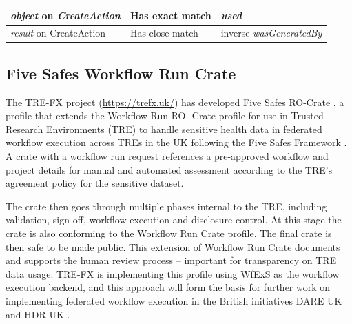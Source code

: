 \documentclass[10pt,letterpaper]{article}
\begin{document}
\begin{table}[!ht]
\begin{adjustwidth}{-1.5cm}{0in}
\begin{tabular}{p{35mm}|p{40mm}|p{40mm}}
  \emph{object} on \emph{CreateAction} &
    Has exact match & 
    \emph{used} 
    \\ \hline
  \emph{result} on CreateAction & 
    Has close match & 
    inverse \emph{wasGeneratedBy} 
  
  \end{tabular}
  \label{rocrate_prov_mapping}
  \end{adjustwidth}
\end{table}
  

\subsection{Five Safes Workflow Run Crate}\label{trusted-workflow-run-crate}

The TRE-FX project \cite{trefx} (\url{https://trefx.uk/}) has developed Five Safes RO-Crate \cite{5s-crate}, a profile that extends the Workflow Run RO- Crate profile for use in Trusted Research Environments (TRE) to handle sensitive health data in federated workflow execution across TREs in the UK following the Five Safes Framework \cite{Desai 2016}.
A crate with a workflow run request references a pre-approved workflow and project details for manual and automated assessment according to the TRE's agreement policy for the sensitive dataset. 

The crate then goes through multiple phases internal to the TRE, including validation, sign-off, workflow execution and disclosure control.
At this stage the crate is also conforming to the Workflow Run Crate profile.
The final crate is then safe to be made public.
This extension of Workflow Run Crate documents and supports the human review process -- important for transparency on TRE data usage. 
TRE-FX is implementing this profile using WfExS as the workflow execution backend, and this approach will form the basis for further work on implementing federated workflow execution in the British initiatives DARE UK and HDR UK \cite{Snowley 2023}.    
\end{document}
